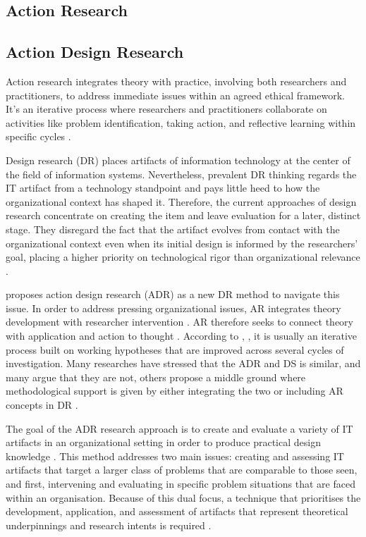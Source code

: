 \subsection{Action Research}
\subsection{Action Design Research}
\par{Action research integrates theory with practice, involving both researchers and practitioners, to address immediate issues within an agreed ethical framework. It's an iterative process where researchers and practitioners collaborate on activities like problem identification, taking action, and reflective learning within specific cycles \citep{avison1999action}.}
\par{Design research (DR) places artifacts of information technology at the center of the field of information systems. Nevertheless, prevalent DR thinking regards the IT artifact from a technology standpoint and pays little heed to how the organizational context has shaped it. Therefore, the current approaches of design research concentrate on creating the item and leave evaluation for a later, distinct stage. They disregard the fact that the artifact evolves from contact with the organizational context even when its initial design is informed by the researchers' goal, placing a higher priority on technological rigor than organizational relevance \citep{sein2011action}.}
\par{\cite{sein2011action} proposes action design research (ADR) as a new DR method to navigate this issue. In order to address pressing organizational issues, AR integrates theory development with researcher intervention \citep{baburoglu1992normative,baskerville1998diversity}. AR therefore seeks to connect theory with application and action to thought \citep{susman1983action}. According to \cite{davison2004principles}, \cite{susman2023assessment}, it is usually an iterative process built on working hypotheses that are improved across several cycles of investigation. Many researches have stressed that the ADR and DS is similar, and many argue that they are not, others propose a middle ground where methodological support is given by either integrating the two \citep{sein2011action} or including AR concepts in DR \citep{pries2007soft}. }
\par{The goal of the ADR research approach is to create and evaluate a variety of IT artifacts in an organizational setting in order to produce practical design knowledge \citep{sein2011action}. This method addresses two main issues: creating and assessing IT artifacts that target a larger class of problems that are comparable to those seen, and first, intervening and evaluating in specific problem situations that are faced within an organisation. Because of this dual focus, a technique that prioritises the development, application, and assessment of artifacts that represent theoretical underpinnings and research intents is required \citep{sein2011action}.}
